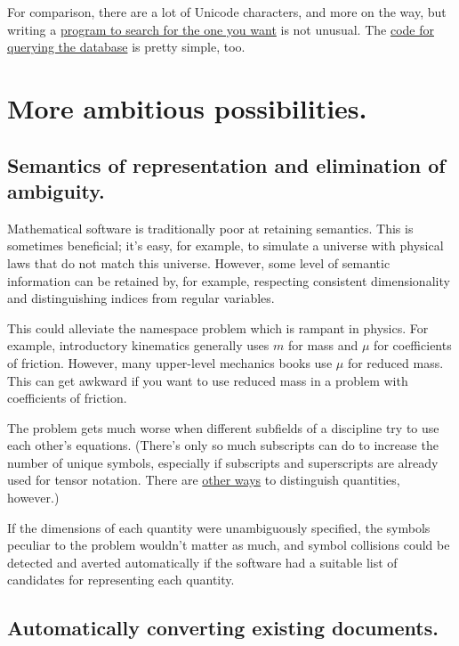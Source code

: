 \documentclass[12pt,letterpaper]{article}
\begin{document}
For comparison,
there are a lot of Unicode characters,
and more on the way,
but writing a
\href{https://mail.python.org/pipermail/python-announce-list/2003-April/002183.html}
{program to search for the one you want} is not unusual.
The
\href{http://sources.debian.net/src/unicode/0.9.7/unicode}
{code for querying the database} is pretty simple, too.

\section{More ambitious possibilities.}\label{sec:ambitious}

\subsection{Semantics of representation and elimination of ambiguity.}

Mathematical software is traditionally poor at retaining semantics.
This is sometimes beneficial;
it's easy, for example,
to simulate a universe with physical laws that do not match this universe.
However, some level of semantic information can be retained by,
for example, respecting consistent dimensionality and distinguishing indices from regular variables.

This could alleviate the namespace problem which is rampant in physics.
For example,
introductory kinematics generally uses $m$ for mass and $\mu$ for coefficients of friction.
However, many upper-level mechanics books use $\mu$ for reduced mass.
This can get awkward if you want to use reduced mass in a problem with coefficients of friction.

The problem gets much worse when different subfields of a discipline try to use each other's equations.
(There's only so much subscripts can do to increase the number of unique symbols,
especially if subscripts and superscripts are already used for tensor notation.
There are \hyperref[color-coding]{other ways} to distinguish quantities, however.)

If the dimensions of each quantity were unambiguously specified,
the symbols peculiar to the problem wouldn't matter as much,
and symbol collisions could be detected and averted automatically
if the software had a suitable list of candidates for representing each quantity.

\subsection{Automatically converting existing documents.}
\end{document}
